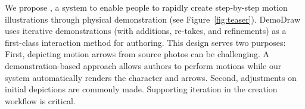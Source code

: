 
We propose \systemname{}, a system to enable people to rapidly create step-by-step motion illustrations through physical demonstration (see Figure~\ref{fig:teaser}). DemoDraw uses iterative demonstrations (with additions, re-takes, and refinements) as a first-class interaction method for authoring. This design serves two purposes: First, depicting motion arrows from source photos can be challenging. A demonstration-based approach allows authors to perform motions while our system automatically renders the character and arrows. Second, adjustments on initial depictions are commonly made. Supporting iteration in the creation workflow is critical.

